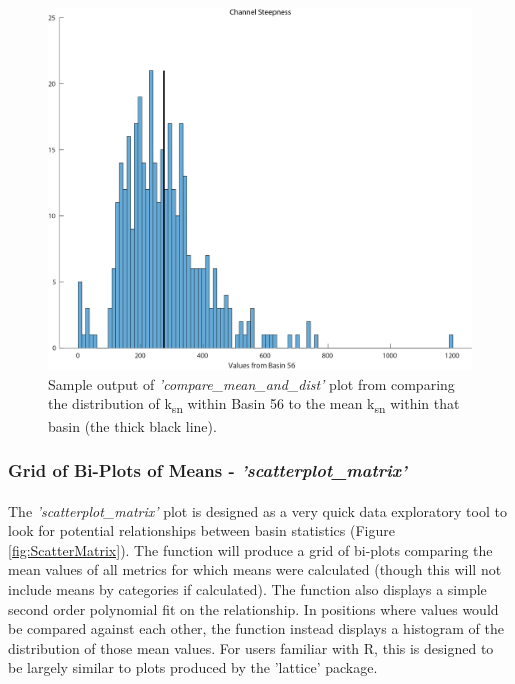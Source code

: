 \begin{figure}[H]
	\centering
	\includegraphics[width=12cm]{PNGs/Basin56_ksn_dist.png}
	\caption{Sample output of \textit{'compare\_mean\_and\_dist'} plot from  comparing the distribution of k\textsubscript{sn} within Basin 56 to the mean k\textsubscript{sn} within that basin (the thick black line).}
	\label{fig:KsnDist}
\end{figure}


\subsubsection{Grid of Bi-Plots of Means - \textit{'scatterplot\_matrix'}} \label{sec:scattermat}
\paragraph{}The \textit{'scatterplot\_matrix'} plot is designed as a very quick data exploratory tool to look for potential relationships between basin statistics (Figure \ref{fig:ScatterMatrix}). The function will produce a grid of bi-plots comparing the mean values of all metrics for which means were calculated (though this will not include means by categories if calculated). The function also displays a simple second order polynomial fit on the relationship. In positions where values would be compared against each other, the function instead displays a histogram of the distribution of those mean values. For users familiar with R, this is designed to be largely similar to plots produced by the 'lattice' package. 

